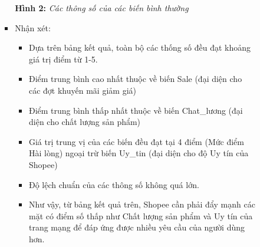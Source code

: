 \documentclass[a4paper]{article}
\theoremstyle{definition}
\begin{document}
\begin{itemize}
\begin{itemize}
\begin{enumerate}
\begin{itemize}
        \begin{center}
            \textbf{Hình 2: }\textit{Các thông số của các biến bình thường}
        \end{center}
\item Nhận xét: 
\begin{itemize}
    \item Dựa trên bảng kết quả, toàn bộ các thống số đều đạt khoảng giá trị điểm từ 1-5.
    \item Điểm trung bình cao nhất thuộc về biến Sale (đại diện cho các đợt khuyến mãi giảm giá)
    \item Điểm trung bình thấp nhất thuộc về biến Chat\_lương (đại diện cho chất lượng sản phẩm)
    \item Giá trị trung vị của các biến đều đạt tại 4 điểm (Mức điểm Hài lòng) ngoại trừ biến Uy\_tin (đại diện cho độ Uy tín của Shopee)
    \item Độ lệch chuẩn của các thông số không quá lớn.
    \item Như vậy, từ bảng kết quả trên, Shopee cần phải đẩy mạnh các mặt có điểm số thấp như Chất lượng sản phẩm và Uy tín của trang mạng để đáp ứng được nhiều yêu cầu của người dùng hơn.
\end{itemize}
\end{itemize}


\end{enumerate}
\end{itemize}
\end{itemize}
\end{document}
